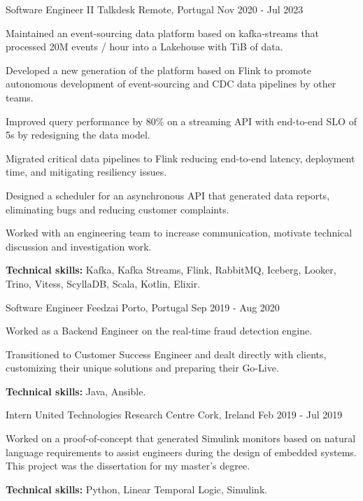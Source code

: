 \begin{cventries}
  \cventry
    {Software Engineer II} %
    {Talkdesk} %
    {Remote, Portugal} %
    {Nov 2020 - Jul 2023} %
    {
      \begin{cvitems} %
        \item {Maintained an event-sourcing data platform based on kafka-streams that processed 20M events / hour into a Lakehouse with TiB of data.}
        \item {Developed a new generation of the platform based on Flink to promote autonomous development of event-sourcing and CDC data pipelines by other teams.}
        \item {Improved query performance by 80\% on a streaming API with end-to-end SLO of 5s by redesigning the data model.}
        \item {Migrated critical data pipelines to Flink reducing end-to-end latency, deployment time, and mitigating resiliency issues.}
        \item {Designed a scheduler for an asynchronous API that generated data reports, eliminating bugs and reducing customer complaints.}
        \item {Worked with an engineering team to increase communication, motivate technical discussion and investigation work.}
        \item {\textbf{Technical skills:} Kafka, Kafka Streams, Flink, RabbitMQ, Iceberg, Looker, Trino, Vitess, ScyllaDB, Scala, Kotlin, Elixir.}
      \end{cvitems}
    }

  \cventry
    {Software Engineer} %
    {Feedzai} %
    {Porto, Portugal} %
    {Sep 2019 - Aug 2020} %
    {
      \begin{cvitems} %
        \item {Worked as a Backend Engineer on the real-time fraud detection engine.}
        \item {Transitioned to Customer Success Engineer and dealt directly with clients, customizing their unique solutions and preparing their Go-Live.}
        \item {\textbf{Technical skills:} Java, Ansible.}
      \end{cvitems}
    }


  \cventry
    {Intern} %
    {United Technologies Research Centre} %
    {Cork, Ireland} %
    {Feb 2019 - Jul 2019} %
    {
      \begin{cvitems} %
        \item {Worked on a proof-of-concept that generated Simulink monitors based on natural language requirements to assist engineers during the design of embedded systems. This project was the dissertation for my master's degree.}
        \item {\textbf{Technical skills:} Python, Linear Temporal Logic, Simulink.}
      \end{cvitems}
    }

\end{cventries}
